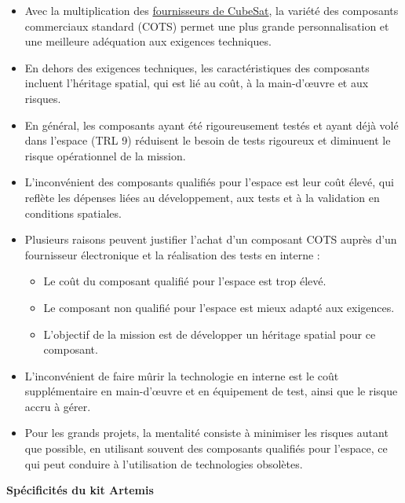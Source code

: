 \begin{itemize}
    \item Avec la multiplication des \href{http://www.cubesat.org/}{fournisseurs de CubeSat}, la variété des composants commerciaux standard (COTS) permet une plus grande personnalisation et une meilleure adéquation aux exigences techniques.  
    \item En dehors des exigences techniques, les caractéristiques des composants incluent l’héritage spatial, qui est lié au coût, à la main-d'œuvre et aux risques.  
    \item En général, les composants ayant été rigoureusement testés et ayant déjà volé dans l’espace (TRL 9) réduisent le besoin de tests rigoureux et diminuent le risque opérationnel de la mission.  
    \item L’inconvénient des composants qualifiés pour l’espace est leur coût élevé, qui reflète les dépenses liées au développement, aux tests et à la validation en conditions spatiales.  
    \item Plusieurs raisons peuvent justifier l’achat d’un composant COTS auprès d’un fournisseur électronique et la réalisation des tests en interne :  
    \begin{itemize}
        \item Le coût du composant qualifié pour l’espace est trop élevé.  
        \item Le composant non qualifié pour l’espace est mieux adapté aux exigences.  
        \item L’objectif de la mission est de développer un héritage spatial pour ce composant.  
    \end{itemize}
    \item L’inconvénient de faire mûrir la technologie en interne est le coût supplémentaire en main-d'œuvre et en équipement de test, ainsi que le risque accru à gérer.  
    \item Pour les grands projets, la mentalité consiste à minimiser les risques autant que possible, en utilisant souvent des composants qualifiés pour l’espace, ce qui peut conduire à l’utilisation de technologies obsolètes.  
\end{itemize}
\textbf{Spécificités du kit Artemis}
